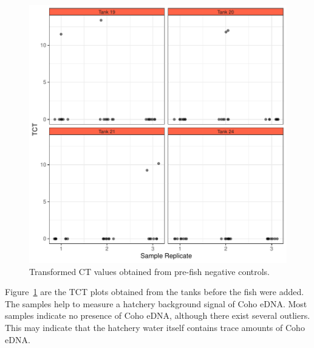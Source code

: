 \begin{figure}[H]
\includegraphics[scale=0.8]{Chapter4Images/zerofishtct.pdf}
\caption{Transformed CT values obtained from pre-fish negative controls. }
\label{lab:flowzerofish}
\end{figure}

Figure~\ref{lab:flowzerofish} are the TCT plots obtained from the tanks before the fish were added. The samples help to measure a hatchery background signal of Coho eDNA. Most samples indicate no presence of Coho eDNA, although there exist several outliers. This may indicate that the hatchery water itself contains trace amounts of Coho eDNA.




